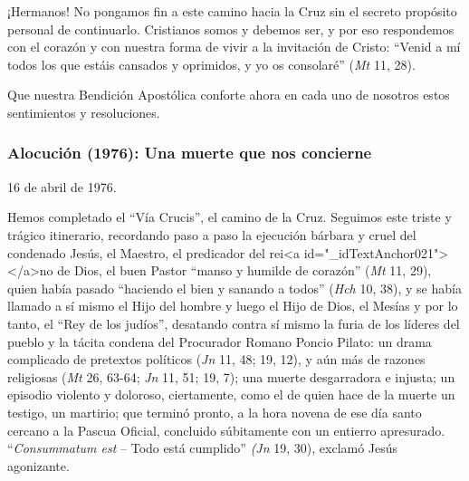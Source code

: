 			\begin{body}¡Hermanos! No pongamos fin a este camino hacia la Cruz sin el secreto propósito personal de continuarlo. Cristianos somos y debemos ser, y por eso respondemos con el corazón y con nuestra forma de vivir a la invitación de Cristo: “Venid a mí todos los que estáis cansados y oprimidos, y yo os consolaré” (\textit{Mt} 11, 28).\end{body}
			
			\begin{body}Que nuestra Bendición Apostólica conforte ahora en cada uno de nosotros estos sentimientos y resoluciones.\end{body}
			
			\subsubsection{Alocución (1976): Una muerte que nos concierne}
			
			\begin{referencia}16 de abril de 1976. \end{referencia}
			
			\begin{body}Hemos completado\textbf{ }el “Vía Crucis”, el camino de la Cruz. Seguimos este triste y trágico itinerario, recordando paso a paso la ejecución bárbara y cruel del condenado Jesús, el Maestro, el predicador del rei<a id="_idTextAnchor021"></a>no de Dios, el buen Pastor “manso y humilde de corazón” (\textit{Mt} 11, 29), quien había pasado “haciendo el bien y sanando a todos” (\textit{Hch }10, 38), y se había llamado a sí mismo el Hijo del hombre y luego el Hijo de Dios, el Mesías y por lo tanto, el “Rey de los judíos”, desatando contra sí mismo la furia de los líderes del pueblo y la tácita condena del Procurador Romano Poncio Pilato: un drama complicado de pretextos políticos (\textit{Jn} 11, 48; 19, 12), y aún más de razones religiosas (\textit{Mt} 26, 63-64; \textit{Jn} 11, 51; 19, 7); una muerte desgarradora e injusta; un episodio violento y doloroso, ciertamente, como el de quien hace de la muerte un testigo, un martirio; que terminó pronto, a la hora novena de ese día santo cercano a la Pascua Oficial, concluido súbitamente con un entierro apresurado. “\textit{Consummatum est }– Todo está cumplido” \textit{(Jn }19, 30), exclamó Jesús agonizante.\end{body}
			
